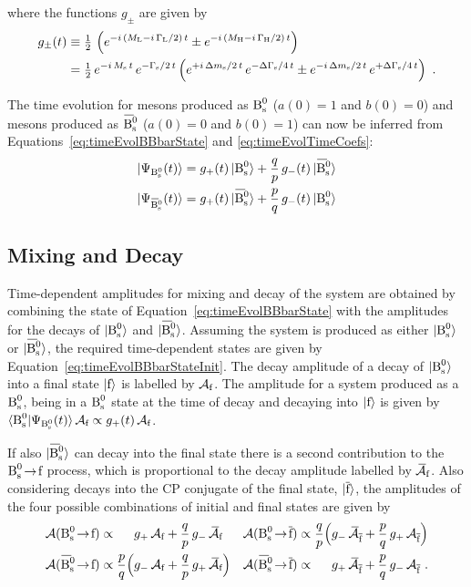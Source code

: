 where the functions $g_\pm$ are given by
\begin{align}
  \label{eq:timeEvolQp}
  g_\pm(t) &\equiv \tfrac{1}{2}\, \left( e^{-i\,(M_\text{L}-i\,\Gamma_\text{L}/2)\,t} \pm e^{-i\,(M_\text{H}-i\,\Gamma_\text{H}/2)\,t} \right) \\
           &= \tfrac{1}{2}\, e^{-i\,M_\text{s}\,t}\, e^{-\Gamma_\text{s}/2\,t}
                \left( e^{+i\,\Delta m_\text{s}/2\,t}\, e^{-\Delta\Gamma_\text{s}/4\,t} \pm e^{-i\,\Delta m_\text{s}/2\,t}\, e^{+\Delta\Gamma_\text{s}/4\,t} \right) \nonumber
           \ .
\end{align}

The time evolution for mesons produced as $\text{B}_\text{s}^\text{0}$ ($a(0)=1$ and $b(0)=0$) and mesons produced as $\Bsbar$ ($a(0)=0$ and $b(0)=1$) can now be
inferred from Equations~\ref{eq:timeEvolBBbarState} and \ref{eq:timeEvolTimeCoefs}:
\begin{subequations}
  \label{eq:timeEvolBBbarStateInit}
  \begin{align}
    |\Psi_{\Bs}(t)\rangle    = g_+(t)\,\Bsst    + \qp\,g_-(t)\,\Bsbarst \\
    |\Psi_{\Bsbar}(t)\rangle = g_+(t)\,\Bsbarst + \pq\,g_-(t)\,\Bsst
  \end{align}
\end{subequations}

\subsection{Mixing and Decay}
\label{sec:pheno_mix_decay}

Time-dependent amplitudes for mixing and decay of the \BsBsbar{} system are obtained by combining the state of
Equation~\ref{eq:timeEvolBBbarState} with the amplitudes for the decays of $|\text{B}_\text{s}^\text{0}\rangle$ and $\Bsbarst$. Assuming the system is produced as
either $|\text{B}_\text{s}^\text{0}\rangle$ or $\Bsbarst$, the required time-dependent states are given by Equation~\ref{eq:timeEvolBBbarStateInit}. The decay amplitude
of a decay of $|\text{B}_\text{s}^\text{0}\rangle$ into a final state $|\text{f}\rangle$ is labelled by $\mathcal{A}_{\text{f}}$. The amplitude for a system produced as a $\text{B}_\text{s}^\text{0}$, being in a $\text{B}_\text{s}^\text{0}$
state at the time of decay and decaying into $|\text{f}\rangle$ is given by $\langle\text{B}_\text{s}^\text{0}|\Psi_{\text{B}_\text{s}^\text{0}}(t)\rangle\,\mathcal{A}_{\text{f}} \propto g_+(t)\,\mathcal{A}_{\text{f}}$.

If also $\Bsbarst$ can decay into the final state there is a second contribution to the $\text{B}_\text{s}^\text{0}\!\to\!{\text{f}}$ process, which is proportional to the
decay amplitude labelled by $\kern 0.23em \overline{\kern -0.23em \mathcal{A}}_{\text{f}}$. Also considering decays into the CP conjugate of the final state, $|\overline{\text{f}}\rangle$, the amplitudes of the
four possible combinations of initial and final states are given by
\begin{equation}
  \label{eq:mixDecayAmps}
  \begin{alignedat}{4}
    \mathcal{A}(\Bstof) &\propto& & g_+\, \Af + \qp\, g_-\, \Abarf &
    \quad
    \mathcal{A}(\Bstofbar) &\propto& \;\qp \Big( & g_-\, \Abarfbar + \pq\, g_+\, \Afbar \Big)
    \\
    \mathcal{A}(\Bsbartof) &\propto& \;\pq \Big( & g_-\, \Af + \qp\, g_+\, \Abarf \Big) &
    \mathcal{A}(\Bsbartofbar) &\propto& & g_+\, \Abarfbar + \pq\, g_-\, \Afbar
    \ .
  \end{alignedat}
\end{equation}

